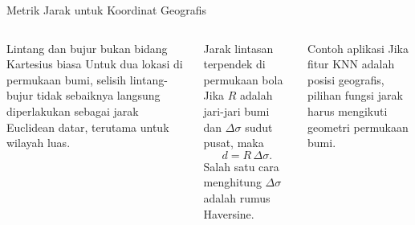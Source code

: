 \documentclass[aspectratio=169,11pt]{beamer}
\begin{document}
\begin{frame}{Metrik Jarak untuk Koordinat Geografis}
\begin{columns}[T]
\begin{block}{Lintang dan bujur bukan bidang Kartesius biasa}
\small
Untuk dua lokasi di permukaan bumi, selisih lintang-bujur tidak sebaiknya langsung diperlakukan sebagai jarak Euclidean datar, terutama untuk wilayah luas.
\end{block}
\begin{block}{Jarak lintasan terpendek di permukaan bola}
\footnotesize
Jika $R$ adalah jari-jari bumi dan $\Delta\sigma$ sudut pusat, maka
\[
d=R\,\Delta\sigma.
\]
Salah satu cara menghitung $\Delta\sigma$ adalah rumus Haversine.
\end{block}
\centering
{}
\begin{alertblock}{Contoh aplikasi}
\footnotesize
Jika fitur KNN adalah posisi geografis, pilihan fungsi jarak harus mengikuti geometri permukaan bumi.
\end{alertblock}
\end{columns}
\end{frame}
\end{document}

